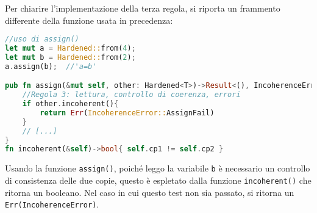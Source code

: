 \noindent
\begin{center}
\end{center}
Per chiarire l'implementazione della terza regola, si riporta un frammento differente della funzione usata in precedenza: 

\begin{lstlisting}[language=rust, style=boxed]
//uso di assign()
let mut a = Hardened::from(4); 
let mut b = Hardened::from(2); 
a.assign(b);  //'a=b'

pub fn assign(&mut self, other: Hardened<T>)->Result<(), IncoherenceError>{
    //Regola 3: lettura, controllo di coerenza, errori
    if other.incoherent(){
        return Err(IncoherenceError::AssignFail)
    }
    // [...]
}
fn incoherent(&self)->bool{ self.cp1 != self.cp2 }
\end{lstlisting}
Usando la funzione \texttt{assign()}, poiché leggo la variabile \texttt{b} è necessario un controllo di consistenza delle due copie, questo è espletato dalla funzione \texttt{incoherent()} che ritorna un booleano. Nel caso in cui questo test non sia passato, si ritorna un \texttt{Err(IncoherenceError)}.

